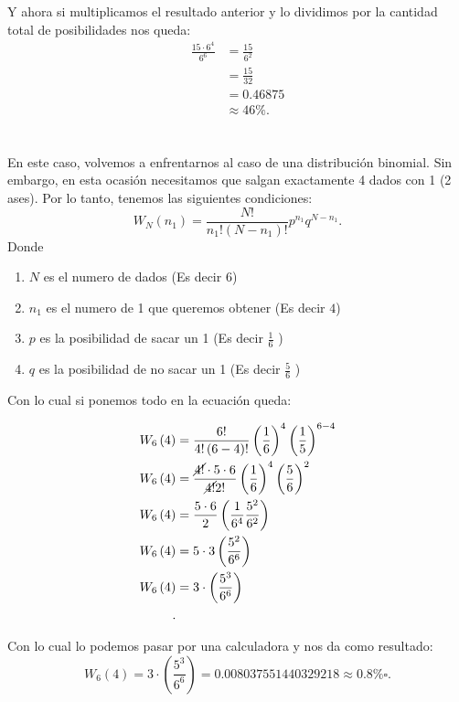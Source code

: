 \documentclass{report}
\begin{document}
Y ahora si multiplicamos el resultado anterior y lo dividimos por la cantidad total de posibilidades nos queda:
\begin{align*}
  \frac{15 \cdot 6^{4}}{6^{6}} &= \frac{15}{6^{2}} \\
  &= \frac{15}{32} \\
  &= 0.46875 \\
  &\approx 46\%
.\end{align*}

\section{}

En este caso, volvemos a enfrentarnos al caso de una distribución binomial. Sin embargo, en esta ocasión necesitamos que salgan exactamente 4 dados con 1 (2 ases). Por lo tanto, tenemos las siguientes condiciones: \[
W_N\left( n_1 \right) = \frac{N!}{n_1!\left( N-n_1 \right)!}p^{n_1}q^{N - n_1}
.\] Donde
\begin{enumerate}
  \item $N$ es el numero de dados (Es decir $6$)
  \item $n_1$ es el numero de 1 que queremos obtener (Es decir $4$)
  \item $p$ es la posibilidad de sacar un 1 (Es decir $\frac{1}{6}$ )
  \item $q$ es la posibilidad de no sacar un 1 (Es decir  $\frac{5}{6}$ )
\end{enumerate}

Con lo cual si ponemos todo en la ecuación queda:

\begin{align*}
  W_6\left( 4 \right) &= \frac{6!}{4!\left( 6 - 4 \right)!}\left( \frac{1}{6} \right) ^{4} \left( \frac{1}{5} \right) ^{6-4} \\
  W_6\left( 4 \right) &= \frac{\cancel{4!} \cdot 5 \cdot 6}{\cancel{4!}2!}\left( \frac{1}{6} \right)^{4}\left( \frac{5}{6} \right)^{2} \\
  W_6\left( 4 \right) &= \frac{5\cdot 6}{2}\left( \frac{1}{6^{4}}\frac{5^2}{6^2} \right)  \\
  W_6\left( 4 \right) &= 5\cdot 3 \left( \frac{5^2}{6^{6}} \right)  \\
  W_6\left( 4 \right) &= 3\cdot \left( \frac{5^{3}}{6^{6}} \right)  \\
.\end{align*}

Con lo cual lo podemos pasar por una calculadora y nos da como resultado: \[
W_6\left( 4 \right) = 3 \cdot \left( \frac{5^{3}}{6^{6}} \right) = 0.008037551440329218 \approx 0.8\% \square
.\] 
\end{document}
